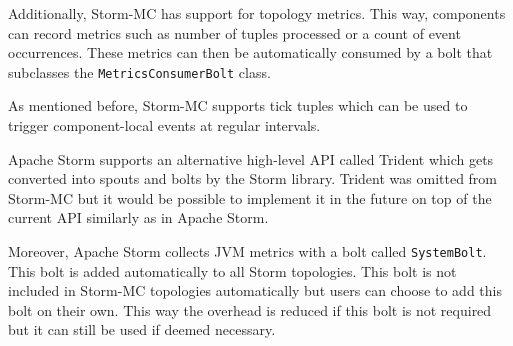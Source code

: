Additionally, Storm-MC has support for topology metrics. This way, components can record metrics such as number of tuples processed or a count of event occurrences. These metrics can then be automatically consumed by a bolt that subclasses the \texttt{MetricsConsumerBolt} class.

As mentioned before, Storm-MC supports tick tuples which can be used  to trigger component-local events at regular intervals.




Apache Storm supports an alternative high-level API called Trident which gets converted into spouts and bolts by the Storm library. Trident was omitted from Storm-MC but it would be possible to implement it in the future on top of the current API similarly as in Apache Storm.

Moreover, Apache Storm collects JVM metrics with a bolt called \texttt{SystemBolt}. This bolt is added automatically to all Storm topologies. This bolt is not included in Storm-MC topologies automatically but users can choose to add this bolt on their own. This way the overhead is reduced if this bolt is not required but it can still be used if deemed necessary.



